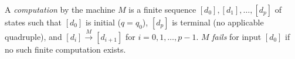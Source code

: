 A \emph{computation} by the machine $M$ is a finite sequence $[d_0], [d_1], \ldots, [d_p]$ of states such that $[d_0]$ is initial ($q = q_0$), $[d_p]$ is terminal (no applicable quadruple), and $[d_i] \xrightarrow{M} [d_{i+1}]$ for $i = 0, 1, \ldots, p-1$. $M$ \emph{fails} for input $[d_0]$ if no such finite computation exists.
